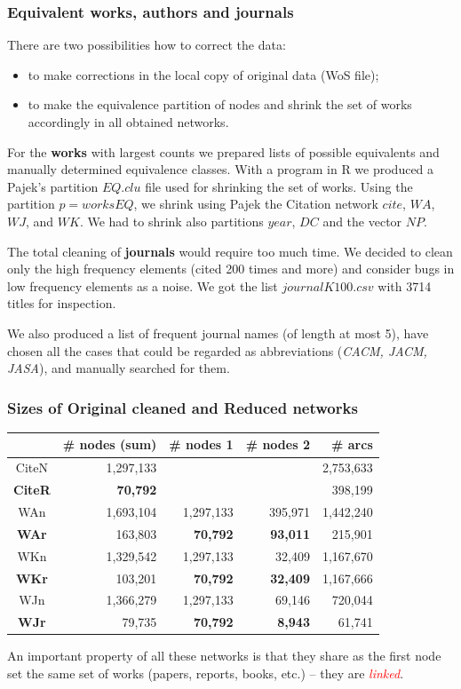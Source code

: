 \documentclass[hyperref={pdfstartview={FitBH -32768},
                         pdfpagemode=FullScreen,
                         plainpages=false,
                         colorlinks=true}
              ]{beamer}
\newcommand{\keyw}[1]{\textcolor{red}{\emph{#1}}}
\begin{document}
\begin{frame}[fragile]
\frametitle{Equivalent works, authors and journals}
\footnotesize

There are two possibilities how to correct the data:
\begin{itemize}
\item to make corrections in the local copy of original data (WoS file);
\item to make the equivalence partition of nodes and shrink the set of works accordingly in all  obtained networks.
\end{itemize}

For the \textbf{works} with largest counts we prepared lists of possible equivalents and manually determined equivalence classes. With a program in R we produced a Pajek's partition $EQ.clu$ file used for shrinking the set of works. Using the partition $p=worksEQ$, we shrink using Pajek the Citation network $cite$, $WA$, $WJ$, and $WK$. We had to shrink also partitions $year$,  $DC$ and the vector $NP$. \smallskip 


The total cleaning of \textbf{journals} would require too much time. We decided to clean only the high frequency elements (cited 200 times and more) and consider bugs in low frequency elements as a noise. We got the list $journalK100.csv$ with 3714 titles for inspection.\smallskip  

We also produced a list of frequent journal names (of length at most 5), have chosen all the cases that could be regarded as abbreviations (\textit{CACM, JACM, JASA}), and manually searched for them. 

\end{frame}

\begin{frame}[fragile]
\frametitle{Sizes of Original cleaned and Reduced networks}
\small 

\begin{center}
\begin{tabular}{c|r|r|r|r}
	&\# nodes (sum)	& \# nodes 1	&\# nodes 2	& \# arcs \\ \hline		 
CiteN & 1,297,133 & & & 2,753,633\\ 
\textbf{CiteR} & \textbf{70,792} & & & 398,199 \\ \hline
WAn	& 1,693,104	& 1,297,133	& 395,971	& 1,442,240 \\ 	
\textbf{WAr}	& 163,803	& \textbf{70,792}	& \textbf{93,011}	& 215,901 \\ \hline
WKn &  	1,329,542	& 1,297,133	& 32,409	& 1,167,670 \\  
\textbf{WKr}	& 103,201	& \textbf{70,792}	& \textbf{32,409}	& 1,167,666 \\ \hline
WJn & 	1,366,279	& 1,297,133	& 69,146	& 720,044    \\ 	
\textbf{WJr} 	& 79,735	& \textbf{70,792}	& \textbf{8,943}	& 61,741 \\ \hline
\end{tabular}				
\end{center}		

An important property of all these networks is that they share as the first node set the same set of works (papers, reports, books, etc.) -- they are \keyw{linked}.
\end{frame}
\end{document}
